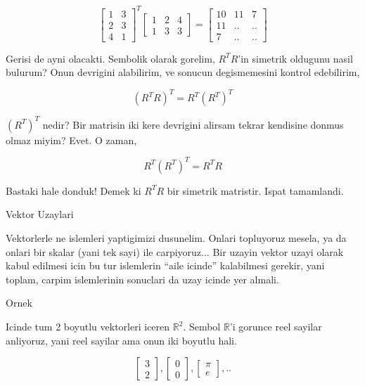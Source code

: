 \documentclass[12pt,fleqn]{article}\usepackage{../common}
\begin{document}
$$ 
\left[\begin{array}{rr}
1 & 3 \\
2 & 3 \\
4 & 1 
\end{array}\right]^T
\left[\begin{array}{rrr}
1 & 2 & 4 \\
1 & 3 & 3 
\end{array}\right]
=
\left[\begin{array}{rrr}
10 & 11 & 7 \\
11 & .. & .. \\
7 & .. & ..
\end{array}\right]
 $$  

Gerisi de ayni olacakti. Sembolik olarak gorelim, $R^TR$'in simetrik
oldugunu nasil bulurum? Onun devrigini alabilirim, ve sonucun degismemesini
kontrol edebilirim,

$$ (R^TR)^T = R^T(R^T)^T $$

$(R^T)^T$ nedir? Bir matrisin iki kere devrigini alirsam tekrar kendisine
donmus olmaz miyim? Evet. O zaman, 

$$  R^T(R^T)^T = R^T R $$

Bastaki hale donduk! Demek ki $R^TR$ bir simetrik matristir. Ispat
tamamlandi. 

Vektor Uzaylari

Vektorlerle ne islemleri yaptigimizi dusunelim. Onlari topluyoruz mesela,
ya da onlari bir skalar (yani tek sayi) ile carpiyoruz... Bir uzayin vektor
uzayi olarak kabul edilmesi icin bu tur islemlerin ``aile icinde''
kalabilmesi gerekir, yani toplam, carpim islemlerinin sonuclari da uzay
icinde yer almali. 

Ornek

Icinde tum 2 boyutlu vektorleri iceren $ \mathbb{R}^2 $. Sembol
$\mathbb{R}$'i gorunce reel sayilar anliyoruz, yani reel sayilar ama onun
iki boyutlu hali.

$$ 
\left[\begin{array}{r}
3 \\ 2 
\end{array}\right], 
\left[\begin{array}{r}
0 \\ 0
\end{array}\right], 
\left[\begin{array}{r}
\pi \\ e
\end{array}\right], 
..
 $$
\end{document}
